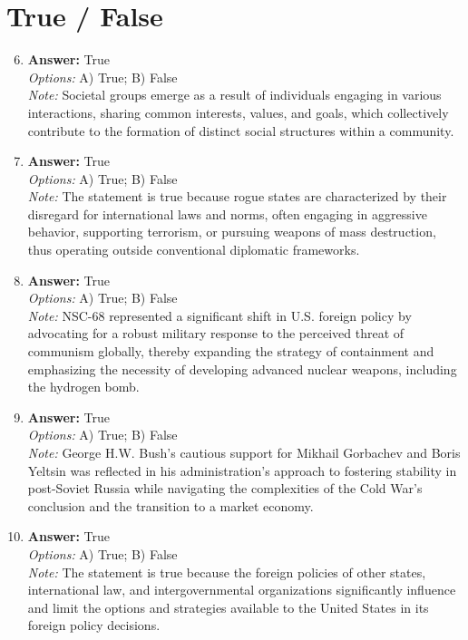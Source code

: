\documentclass[12pt]{article}
\begin{document}
\section*{True / False}
\begin{enumerate}[label=\arabic*.]
\setcounter{enumi}{5}
\item \textbf{Answer:} True
\\ \textit{Options:} A) True; B) False
\\ \textit{Note:} Societal groups emerge as a result of individuals engaging in various interactions, sharing common interests, values, and goals, which collectively contribute to the formation of distinct social structures within a community.
\item \textbf{Answer:} True
\\ \textit{Options:} A) True; B) False
\\ \textit{Note:} The statement is true because rogue states are characterized by their disregard for international laws and norms, often engaging in aggressive behavior, supporting terrorism, or pursuing weapons of mass destruction, thus operating outside conventional diplomatic frameworks.
\item \textbf{Answer:} True
\\ \textit{Options:} A) True; B) False
\\ \textit{Note:} NSC-68 represented a significant shift in U.S. foreign policy by advocating for a robust military response to the perceived threat of communism globally, thereby expanding the strategy of containment and emphasizing the necessity of developing advanced nuclear weapons, including the hydrogen bomb.
\item \textbf{Answer:} True
\\ \textit{Options:} A) True; B) False
\\ \textit{Note:} George H.W. Bush's cautious support for Mikhail Gorbachev and Boris Yeltsin was reflected in his administration's approach to fostering stability in post-Soviet Russia while navigating the complexities of the Cold War's conclusion and the transition to a market economy.
\item \textbf{Answer:} True
\\ \textit{Options:} A) True; B) False
\\ \textit{Note:} The statement is true because the foreign policies of other states, international law, and intergovernmental organizations significantly influence and limit the options and strategies available to the United States in its foreign policy decisions.
\end{enumerate}
\end{document}
